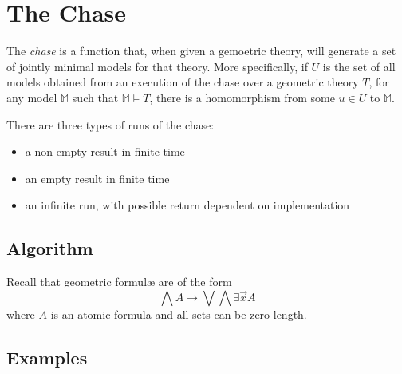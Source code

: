 \section{The Chase}

	The \emph{chase} is a function that, when given a gemoetric theory, will
	generate a set of jointly minimal models for that theory. More
	specifically, if $U$ is the set of all models obtained from an execution of
	the chase over a geometric theory $T$, for any model $\mathbb{M}$ such that
	$\mathbb{M} \models T$, there is a homomorphism from some $u \in U$ to
	$\mathbb{M}$.

	There are three types of runs of the chase:
	\begin{itemize}
	\item a non-empty result in finite time
	\item an empty result in finite time
	\item an infinite run, with possible return dependent on implementation
	\end{itemize}

	\subsection{Algorithm}

	Recall that geometric formul{\ae} are of the form
	\[\bigwedge A \to \bigvee \bigwedge \exists \vec{x} A\]
	where $A$ is an atomic formula and all sets can be zero-length.

	\subsection{Examples}
